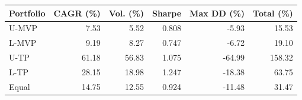\begin{tabular}{lrrrrr}
\toprule
Portfolio & CAGR (\%) & Vol. (\%) & Sharpe & Max DD (\%) & Total (\%) \\
\midrule
U-MVP & 7.53 & 5.52 & 0.808 & -5.93 & 15.53 \\
L-MVP & 9.19 & 8.27 & 0.747 & -6.72 & 19.10 \\
U-TP & 61.18 & 56.83 & 1.075 & -64.99 & 158.32 \\
L-TP & 28.15 & 18.98 & 1.247 & -18.38 & 63.75 \\
Equal & 14.75 & 12.55 & 0.924 & -11.48 & 31.47 \\
\bottomrule
\end{tabular}
